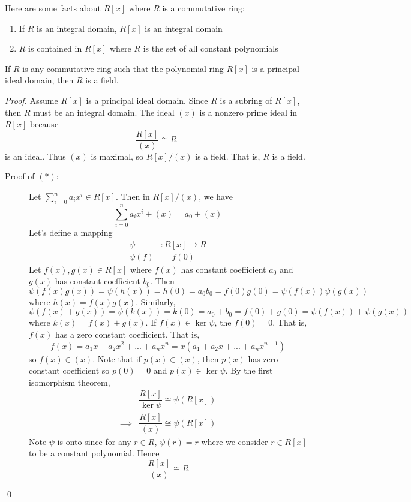 \begin{fact}
    Here are some facts about $R[x]$ where $R$ is a commutative ring:
    \begin{enumerate}
        \item If $R$ is an integral domain, $R[x]$ is an integral domain
        \item $R$ is contained in $R[x]$ where $R$ is the set of all constant polynomials
    \end{enumerate}
\end{fact}

\begin{proposition}
    If $R$ is any commutative ring such that the polynomial ring $R[x]$ is a principal ideal domain, then $R$ is a field.
\end{proposition}

\begin{proof}
    Assume $R[x]$ is a principal ideal domain. Since $R$ is a subring of $R[x]$, then $R$ must be an integral domain. The ideal $(x)$ is a nonzero prime ideal in $R[x]$ because
    \begin{equation}
        \dfrac{R[x]}{(x)} \cong R
        \tag{$*$}
    \end{equation}
    is an ideal. Thus $(x)$ is maximal, so $R[x]/(x)$ is a field. That is, $R$ is a field. \\
    \begin{description}
        \item[Proof of $(*)$: ] Let $\sum_{i=0}^{n}a_ix^i \in R[x]$. Then in $R[x]/(x)$, we have
        $$\sum_{i=0}^{n}a_ix^i + (x) = a_0 + (x)$$
        Let's define a mapping 
        \begin{align*}
            \psi &: R[x] \to R \\
            \psi(f) &= f(0)
        \end{align*}
        Let $f(x),g(x) \in R[x]$ where $f(x)$ has constant coefficient $a_0$ and $g(x)$ has constant coefficient $b_0$. Then
        $$\psi(f(x)g(x)) = \psi(h(x)) = h(0) = a_0b_0 = f(0)g(0) = \psi(f(x))\psi(g(x))$$
        where $h(x) = f(x)g(x)$. Similarly,
        $$\psi(f(x)+g(x)) = \psi(k(x)) = k(0) = a_0 + b_0 = f(0) + g(0) = \psi(f(x)) + \psi(g(x))$$
        where $k(x) = f(x) + g(x)$. If $f(x) \in \ker \psi$, the $f(0) = 0$. That is, $f(x)$ has a zero constant coefficient. That is,
        $$f(x) = a_1x+a_2x^2 +... +a_nx^n=x(a_1+a_2x+...+a_nx^{n-1})$$
        so $f(x) \in (x)$. Note that if $p(x) \in (x)$, then $p(x)$ has zero constant coefficient so $p(0) = 0$ and $p(x) \in \ker \psi$. By the first isomorphism theorem,
        \begin{align*}
            &\dfrac{R[x]}{\ker \psi} \cong \psi(R[x]) \\
            \implies &\dfrac{R[x]}{(x)}\cong \psi(R[x])
        \end{align*}
        Note $\psi$ is onto since for any $r \in R$, $\psi(r) = r$ where we consider $r \in R[x]$ to be a constant polynomial. Hence
        $$\dfrac{R[x]}{(x)} \cong R$$
    \end{description}
    \qed
\end{proof}